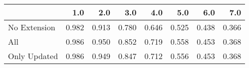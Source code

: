 \begin{tabular}{lrrrrrrr}
\toprule
{} &   1.0 &   2.0 &   3.0 &   4.0 &   5.0 &   6.0 &   7.0 \\
\midrule
No Extension & 0.982 & 0.913 & 0.780 & 0.646 & 0.525 & 0.438 & 0.366 \\
All          & 0.986 & 0.950 & 0.852 & 0.719 & 0.558 & 0.453 & 0.368 \\
Only Updated & 0.986 & 0.949 & 0.847 & 0.712 & 0.556 & 0.453 & 0.368 \\
\bottomrule
\end{tabular}
